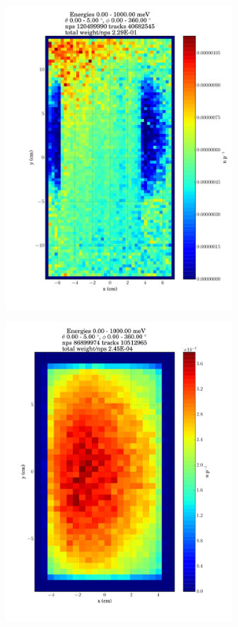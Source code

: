 \documentclass[a4paper,
              ]{jacow}
\begin{document}
\begin{figure}[!htb]
   \centering
   \includegraphics*[trim = 0mm 0mm 0mm 0mm, width=85mm]{graphics/wsdist.pdf}
   \caption{}
   \label{wsdist}
\end{figure}
\begin{figure}[!htb]
   \centering
   \includegraphics*[trim = 0mm 0mm 0mm 0mm, width=85mm]{graphics/sappdist.pdf}
   \caption{}
   \label{sappdist}
\end{figure}
\end{document}
